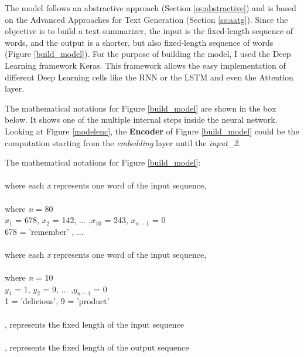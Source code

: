 The model follows an abstractive approach (Section \ref{ss:abstractive}) and is based on the Advanced Approaches for Text Generation (Section \ref{ss:aatg}). Since the objective is to build a text summarizer, the input is the fixed-length sequence of words, and the output is a shorter, but also fixed-length sequence of words (Figure \ref{build_model}). For the purpose of building the model, I used the Deep Learning framework Keras. This framework allows the easy implementation of different Deep Learning cells like the RNN or the LSTM and even the Attention layer. 

The mathematical notations for Figure \ref{build_model} are shown in the box below. It shows one of the multiple internal steps inside the neural network. Looking at Figure \ref{modelenc}, the \textbf{Encoder} of Figure \ref{build_model} could be the computation starting from the \textit{embedding} layer until the \textit{input\_2}.

\begin{tcolorbox}
	The mathematical notations for Figure \ref{build_model}: \\ \\
	
	
	\boldmath{\([x_{1}, x_{2}, x_{3}, ..., {x_{Tx}]}\)} where each \textit{x} represents one word of the input sequence, \\ \\
	where \textit{n} = 80 \\
	\(x_{1}\) = 678, \(x_{2}\) = 142, ... ,\(x_{10}\) = 243, \(x_{n-1}\) = 0 \\
	
	678 = 'remember' , ... \\ \\
	
	\boldmath{\([y_{1}, y_{2}, y_{3}, ..., {y_{Ty}]}\)} where each \textit{x} represents one word of the input sequence, \\ \\
	where \textit{n} = 10\\
	\(y_{1}\) = 1, \(y_{2}\) = 9, ... ,\(y_{n-1}\) = 0 \\
	
	1 = 'delicious', 9 = 'product' \\ \\
	
	, represents the fixed length of the input sequence \\ \\
	, represents the fixed length of the output sequence
\end{tcolorbox}

